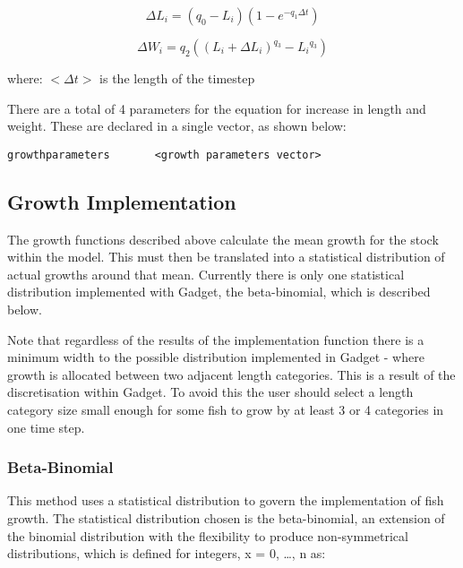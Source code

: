 \documentclass [a4paper, 10pt]{book}
\begin{document}
\begin{equation}\label{eq:growth8l}
\Delta L_{i} = \left( q_{0} - L_{i} \right) \left( 1 - e^{-q_{1} \Delta t} \right)
\end{equation}

\begin{equation}\label{eq:growth8w}
\Delta W_{i} = q_{2} \left( \left( L_{i} + \Delta L_{i} \right) ^{q_{3}} - {L_{i}}^{q_{3}} \right)
\end{equation}

where:\newline
$<\Delta t>$ is the length of the timestep

\bigskip
There are a total of 4 parameters for the equation for increase in length and weight.  These are declared in a single vector, as shown below:

{\small\begin{verbatim}
growthparameters       <growth parameters vector>
\end{verbatim}}

\subsection{Growth Implementation}\label{subsec:stockgrowthimplement}
The growth functions described above calculate the mean growth for the stock within the model. This must then be translated into a statistical distribution of actual growths around that mean.  Currently there is only one statistical distribution implemented with Gadget, the beta-binomial, which is described below.

\bigskip
Note that regardless of the results of the implementation function there is a minimum width to the possible distribution implemented in Gadget - where growth is allocated between two adjacent length categories.  This is a result of the discretisation within Gadget.  To avoid this the user should select a length category size small enough for some fish to grow by at least 3 or 4 categories in one time step.

\subsubsection{Beta-Binomial}
This method uses a statistical distribution to govern the implementation of fish growth.  The statistical distribution chosen is the beta-binomial, an extension of the binomial distribution with the flexibility to produce non-symmetrical distributions, which is defined for integers, x = 0, \ldots, n as:
\end{document}
